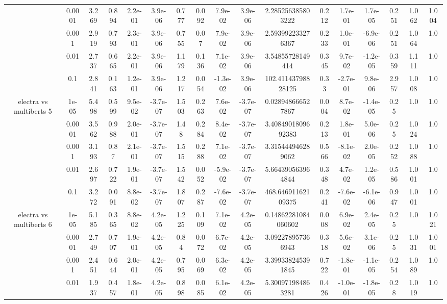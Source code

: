 \begin{tabular}{|c|c|c|c|c|c|c|c|c|c|c|c|c|c|c|c|c|}
 & 0.0001 & 3.269 & 0.894 & 2.2e-01 & 3.9e-06 & 0.777 & 0.092 & 7.9e-02 & 3.9e-06 & 2.285256385803222 & 0.212 & 1.7e-01 & 1.7e-05 & 0.251 & 1.062 & 1.004 \\
 & 0.001 & 2.919 & 0.793 & 2.3e-01 & 3.9e-06 & 0.755 & 0.07 & 7.9e-02 & 3.9e-06 & 2.593992233276367 & 0.233 & 1.0e-01 & -6.9e-06 & 0.251 & 1.064 & 1.0 \\
 & 0.01 & 2.737 & 0.665 & 2.2e-01 & 3.9e-06 & 1.179 & 0.136 & 7.1e-02 & 3.9e-06 & 3.54855728149414 & 0.345 & 9.7e-02 & -1.2e-05 & 0.359 & 1.111 & 1.0 \\
 & 0.1 & 2.841 & 0.163 & 1.2e-01 & 3.9e-06 & 1.217 & 0.054 & -1.3e-02 & 3.9e-06 & 102.41143798828125 & 0.33 & -2.7e-01 & 9.8e-06 & 2.957 & 1.008 & 1.0 \\
\hline
\multirow{5}{*}{electra  vs multiberts 5} & 1e-05 & 5.498 & 0.599 & 9.5e-02 & -3.7e-07 & 1.503 & 0.263 & 7.6e-02 & -3.7e-07 & 0.028948666527867 & 0.004 & 8.7e-02 & -1.4e-05 & 0.25 & 1.0 & 1.0 \\
 & 0.0001 & 3.562 & 0.988 & 2.0e-01 & -3.7e-07 & 1.48 & 0.284 & 8.4e-02 & -3.7e-07 & 3.4084901809692383 & 0.213 & 1.8e-01 & 5.0e-06 & 0.25 & 1.024 & 1.0 \\
 & 0.001 & 3.193 & 0.87 & 2.1e-01 & -3.7e-07 & 1.515 & 0.288 & 7.1e-02 & -3.7e-07 & 3.315444946289062 & 0.566 & -8.1e-02 & 2.0e-05 & 0.252 & 1.088 & 1.0 \\
 & 0.01 & 2.697 & 0.722 & 1.9e-01 & -3.7e-07 & 1.542 & 0.052 & -5.9e-02 & -3.7e-07 & 5.664390563964844 & 0.348 & 4.7e-02 & 1.2e-05 & 0.586 & 1.001 & 1.0 \\
 & 0.1 & 3.272 & 0.091 & 8.8e-02 & -3.7e-07 & 1.807 & 0.287 & -7.6e-02 & -3.7e-07 & 468.64691162109375 & 0.241 & -7.6e-02 & -6.1e-06 & 0.947 & 1.001 & 1.0 \\
\hline
\multirow{5}{*}{electra  vs multiberts 6} & 1e-05 & 5.185 & 0.365 & 8.8e-02 & 4.2e-05 & 1.225 & 0.109 & 7.1e-02 & 4.2e-05 & 0.14862281084060602 & 0.008 & 6.9e-02 & 2.4e-05 & 0.25 & 1.0 & 1.021 \\
 & 0.0001 & 2.749 & 0.707 & 1.9e-01 & 4.2e-05 & 0.84 & 0.072 & 6.7e-02 & 4.2e-05 & 3.092278957366943 & 0.318 & 5.6e-02 & 3.1e-06 & 0.25 & 1.031 & 1.001 \\
 & 0.001 & 2.451 & 0.644 & 2.0e-01 & 4.2e-05 & 0.795 & 0.069 & 6.3e-02 & 4.2e-05 & 3.399338245391845 & 0.722 & -1.8e-01 & -1.1e-05 & 0.254 & 1.089 & 1.0 \\
 & 0.01 & 1.937 & 0.457 & 1.8e-01 & 4.2e-05 & 0.898 & 0.085 & 6.1e-02 & 4.2e-05 & 5.300971984863281 & 0.426 & -1.0e-01 & -1.8e-05 & 0.28 & 1.019 & 1.0 \\

\end{tabular}
